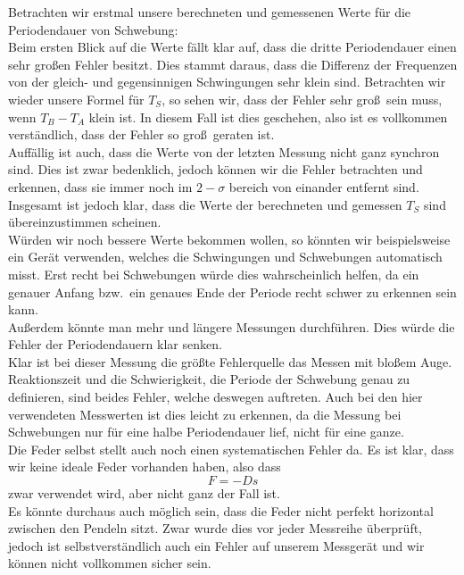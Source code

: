 \documentclass[11pt,a4paper]{article}
\begin{document}
Betrachten wir erstmal unsere berechneten und gemessenen Werte f\"ur die Periodendauer von Schwebung:\\
Beim ersten Blick auf die Werte f\"allt klar auf, dass die dritte Periodendauer einen sehr gro\ss en Fehler besitzt. Dies stammt daraus, dass die Differenz der Frequenzen von der gleich- und gegensinnigen Schwingungen sehr klein sind. Betrachten wir wieder unsere Formel f\"ur $T_S$, so sehen wir, dass der Fehler sehr gro\ss\ sein muss, wenn $T_B-T_A$ klein ist. In diesem Fall ist dies geschehen, also ist es vollkommen verst\"andlich, dass der Fehler so gro\ss\ geraten ist.\\
Auff\"allig ist auch, dass die Werte von der letzten Messung nicht ganz synchron sind. Dies ist zwar bedenklich, jedoch k\"onnen wir die Fehler betrachten und erkennen, dass sie immer noch im $2-\sigma$ bereich von einander entfernt sind.\\
Insgesamt ist jedoch klar, dass die Werte der berechneten und gemessen $T_S$ sind \"ubereinzustimmen scheinen.\\
W\"urden wir noch bessere Werte bekommen wollen, so k\"onnten wir beispielsweise ein Ger\"at verwenden, welches die Schwingungen und Schwebungen automatisch misst. Erst recht bei Schwebungen w\"urde dies wahrscheinlich helfen, da ein genauer Anfang bzw.\ ein genaues Ende der Periode recht schwer zu erkennen sein kann.\\
Au\ss erdem k\"onnte man mehr und l\"angere Messungen durchf\"uhren. Dies w\"urde die Fehler der Periodendauern klar senken.\\
Klar ist bei dieser Messung die gr\"o\ss te Fehlerquelle das Messen mit blo\ss em Auge. Reaktionszeit und die Schwierigkeit, die Periode der Schwebung genau zu definieren, sind beides Fehler, welche deswegen auftreten. Auch bei den hier verwendeten Messwerten ist dies leicht zu erkennen, da die Messung bei Schwebungen nur f\"ur eine halbe Periodendauer lief, nicht f\"ur eine ganze.\\
Die Feder selbst stellt auch noch einen systematischen Fehler da. Es ist klar, dass wir keine ideale Feder vorhanden haben, also dass
\[
	F=-Ds
\]
zwar verwendet wird, aber nicht ganz der Fall ist.\\
Es k\"onnte durchaus auch m\"oglich sein, dass die Feder nicht perfekt horizontal zwischen den Pendeln sitzt. Zwar wurde dies vor jeder Messreihe \"uberpr\"uft, jedoch ist selbstverst\"andlich auch ein Fehler auf unserem Messger\"at und wir k\"onnen nicht vollkommen sicher sein.\\
\end{document}
